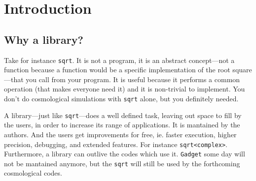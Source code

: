 \section{Introduction}
    
    \subsection{Why a library?}
    \noindent Take for instance \texttt{sqrt}.
    It is not a program, it is an abstract concept---not a function
    because a function would be a specific implementation of the
    root square---that you call from your program.
    It is useful because it performs a common operation
    (that makes everyone need it) and
    it is non-trivial to implement.
    You don't do cosmological simulations with \texttt{sqrt}
    alone, but you definitely needed.
    
    A library---just like \texttt{sqrt}---does a well defined task,
    leaving out space to fill by the users, in order
    to increase its range of applications.
    It is mantained by the authors.
    And the users get improvements for free, ie. 
    faster execution, higher precision, debugging,
    and extended features. For instance \texttt{sqrt<complex>}.
    Furthermore, a library can outlive the codes which use it.
    \texttt{Gadget} some day will not be mantained anymore,
    but the \texttt{sqrt} will still be used by the forthcoming
    cosmological codes.
